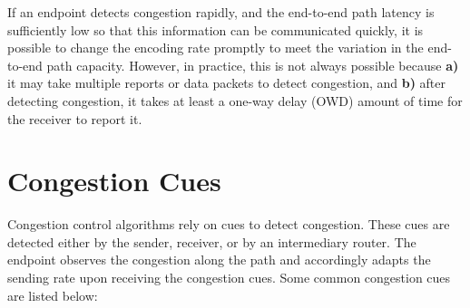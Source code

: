 If an endpoint detects congestion rapidly, and the end-to-end path latency is
sufficiently low so that this information can be communicated quickly, it is
possible to change the encoding rate promptly to meet the variation in the 
end-to-end path capacity. However, in practice, this is not always possible because
\textbf{a)} it may take multiple reports or data packets to detect congestion, and
\textbf{b)} after detecting congestion, it takes at least a one-way delay (OWD)
amount of time for the receiver to report it.


\section{Congestion Cues}
\label{fw.cues}

Congestion control algorithms rely on cues to detect congestion. These cues
are detected either by the sender, receiver, or by an intermediary router. The
endpoint observes the congestion along the path and accordingly adapts the
sending rate upon receiving the congestion cues. 
Some common congestion cues are listed below:

